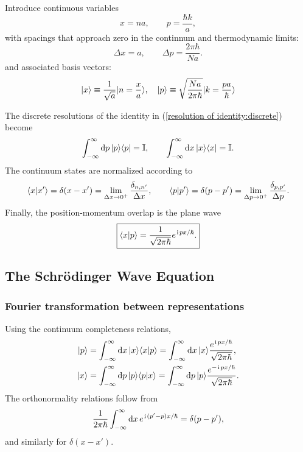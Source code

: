 Introduce continuous variables
\begin{equation}
 x=na,
 \qquad
 p=\frac{\hbar k}{a},
\end{equation}
with spacings that approach zero in the continnum and thermodynamic limits:
\begin{equation}
 \Delta x=a,
 \qquad
 \Delta p=\frac{2\pi\hbar}{Na}.
\end{equation}
and associated basis vectors:
\begin{align}
    |{x}\rangle\equiv\frac1{\sqrt a}|{n=\frac{x}a}\rangle,~~~|{p}\rangle\equiv\sqrt{\frac{Na}{2\pi\hbar}}|{k=\frac{pa}{\hbar}}\rangle
\end{align}


The discrete resolutions of the identity in (\ref{resolution of identity:discrete}) become
\begin{equation}
 \int_{-\infty}^{\infty}\mathrm{d} p\,|{p}\rangle\langle{p}|=\mathbb{I},
 \qquad
 \int_{-\infty}^{\infty}\mathrm{d} x\,|{x}\rangle\langle{x}|=\mathbb{I}.
\end{equation}
The continuum states are normalized according to
\begin{equation}
 \langle{x|x'}\rangle=\delta(x-x')=\lim_{\Delta x\rightarrow0^+}\frac{\delta_{n,n^\prime}}{\Delta x},
 \qquad
 \langle{p|p'}\rangle=\delta(p-p')=\lim_{\Delta p\rightarrow0^+}\frac{\delta_{p,p^\prime}}{\Delta p}.
\end{equation}
Finally, the position-momentum overlap is the plane wave
\begin{equation}
 \boxed{\langle{x|p}\rangle=\frac{1}{\sqrt{2\pi\hbar}}
 e^{\hspace{1pt}\mathrm{i}\hspace{1pt} px/\hbar}.}
\end{equation}

\subsection{The Schr\"odinger Wave Equation}

\subsubsection{Fourier transformation between representations}
Using the continuum completeness relations,
\begin{align}
 |{p}\rangle
 &=\int_{-\infty}^{\infty}\mathrm{d} x\,|{x}\rangle\langle{x|p}\rangle
 =\int_{-\infty}^{\infty}\mathrm{d} x\,|{x}\rangle
 \frac{e^{\hspace{1pt}\mathrm{i}\hspace{1pt} px/\hbar}}{\sqrt{2\pi\hbar}},\\
 |{x}\rangle
 &=\int_{-\infty}^{\infty}\mathrm{d} p\,|{p}\rangle\langle{p|x}\rangle
 =\int_{-\infty}^{\infty}\mathrm{d} p\,|{p}\rangle
 \frac{e^{-\hspace{1pt}\mathrm{i}\hspace{1pt} px/\hbar}}{\sqrt{2\pi\hbar}}.
\end{align}
The orthonormality relations follow from
\begin{equation}
 \frac{1}{2\pi\hbar}\int_{-\infty}^{\infty}\mathrm{d} x\,
 e^{\hspace{1pt}\mathrm{i}\hspace{1pt}(p'-p)x/\hbar}=\delta(p-p'),
\end{equation}
and similarly for $\delta(x-x')$.

